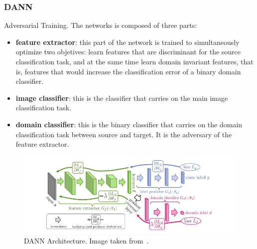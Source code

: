 \documentclass[../main.tex]{subfiles}
\begin{document}
    \subsubsection{DANN}
    Adversarial Training. The networks is composed of three parts:
    \begin{itemize}
        \item \textbf{feature extractor}: this part of the network is trained to simultaneously optimize two objetives: learn features
            that are discriminant for the source classification task, and at the same time learn domain invariant features, that is,
            features that would increase the classification error of a binary domain classifier.
        \item \textbf{image classifier}: this is the classifier that carries on the main image classification task.
        \item \textbf{domain classifier}: this is the binary classifier that carries on the domain classification task between source and
            target. It is the adversary of the feature extractor.
    \end{itemize}

    \begin{figure}
        \centering{}
    	\includegraphics[width=\linewidth]{img/dann-architecture.png}
        \caption{DANN Architecture. Image taken from~\cite{DANN}.}\label{fig:dann-architecture}
	\end{figure}
\end{document}
